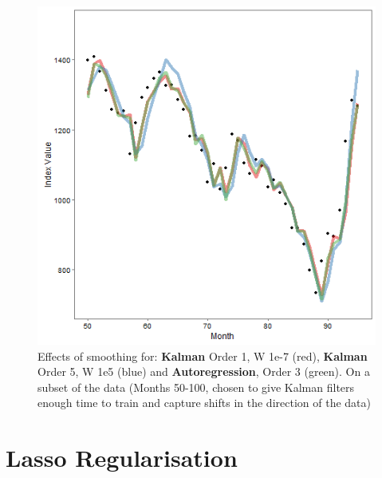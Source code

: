 \documentclass{sig-alternate-05-2015}
\begin{document}
\begin{figure}[ht]
	\includegraphics[width=\linewidth]{DifferentModels.png}
	\centering
	\caption{Effects of smoothing for: \textbf{Kalman} Order 1, W 1e-7 (red), \textbf{Kalman} Order 5, W 1e5 (blue) and \textbf{Autoregression}, Order 3 (green). On a subset of the data (Months 50-100, chosen to give Kalman filters enough time to train and capture shifts in the direction of the data)}
			\label{fig:DifferentModels}
\end{figure}

\section{Lasso Regularisation}
 
\clearpage 

\end{document}
